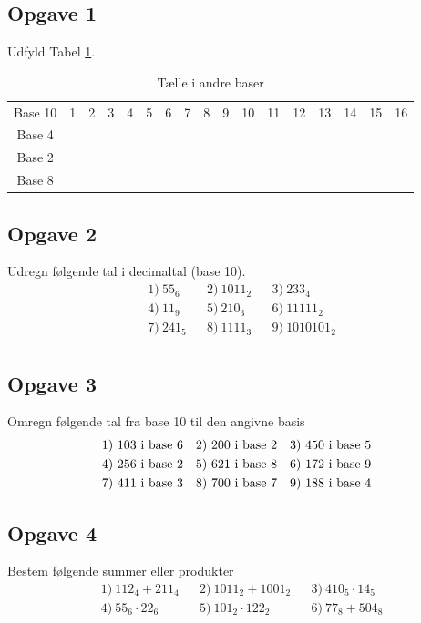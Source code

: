 \subsection*{Opgave 1}
Udfyld Tabel \ref{tab:tælle}.
\begin{table}[H]
	\centering
	\begin{tabular}{ccccccccccccccccc}
		Base 10 & 1 &2 &3&4&5&6&7&8&9&10&11&12 &13 &14 &15 &16 \\
		Base 4 &&&&&&&&&&&&&&&& \\
		Base 2 &&&&&&&&&&&&&&&& \\
		Base 8 &&&&&&&&&&&&&&&&
	\end{tabular}
	\caption{Tælle i andre baser}
	\label{tab:tælle}
\end{table}

\subsection*{Opgave 2}
Udregn følgende tal i decimaltal (base 10).
\begin{align*}
	&1) \ 55_6  & &2) \ 1011_2   & &3) \ 233_4  \\
	&4) \ 11_9  & &5) \ 210_3   & &6) \ 11111_2    \\ 
	&7) \ 241_5  & &8) \ 1111_3   & &9) \ 1010101_2   \\
\end{align*}

\subsection*{Opgave 3}
Omregn følgende tal fra base 10 til den angivne basis
\begin{align*}
	&1) \ 103 \textnormal{ i base 6}  & &2) \ 200 \textnormal{ i base 2}   & &3) \ 450 \textnormal{ i base 5}  \\
	&4) \ 256 \textnormal{ i base 2}  & &5) \ 621 \textnormal{ i base 8}   & &6) \ 172 \textnormal{ i base 9}   \\ 
	&7) \ 411 \textnormal{ i base 3}  & &8) \ 700 \textnormal{ i base 7}   & &9) \ 188 \textnormal{ i base 4}   \\
\end{align*}

\subsection*{Opgave 4}
Bestem følgende summer eller produkter
\begin{align*}
	&1) \ 112_4 + 211_4   &&2) \ 1011_2+1001_2    &&3) \  410_5\cdot 14_5  \\
	&4) \ 55_6\cdot 22_6   &&5) \  101_2\cdot 122_2   &&6) \ 77_8+504_8   \\
\end{align*}

